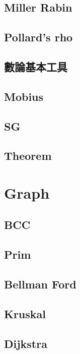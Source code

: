 \subsection{Miller Rabin}

\subsection{Pollard's rho}

\subsection{數論基本工具}

\subsection{Mobius}

\subsection{SG}

\subsection{Theorem}



\section{Graph}

\subsection{BCC}

\subsection{Prim}

\subsection{Bellman Ford}

\subsection{Kruskal}

\subsection{Dijkstra}

